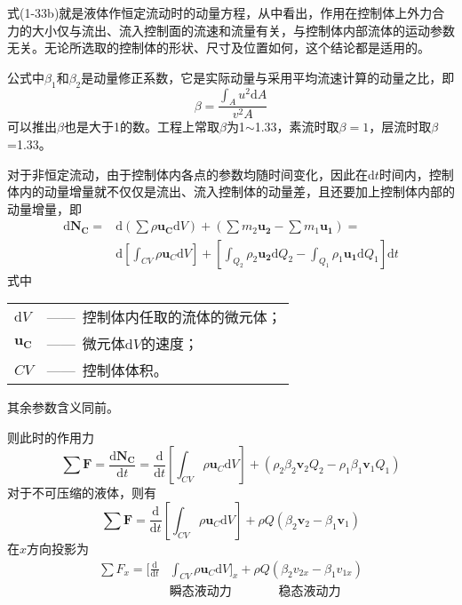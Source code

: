     式(1-33b)就是液体作恒定流动时的动量方程，从中看出，作用在控制体上外力合力的大小仅与流出、流入控制面的流速和流量有关，与控制体内部流体的运动参数无关。无论所选取的控制体的形状、尺寸及位置如何，这个结论都是适用的。    

    公式中$\beta_1$和$\beta_2$是动量修正系数，它是实际动量与采用平均流速计算的动量之比，即 
    \begin{equation}
     \beta=\frac{\int_A u^2\mathrm{d}A}{v^2A}
      \end{equation} 
 可以推出$\beta$也是大于1的数。工程上常取$\beta$为1$\sim$1.33，素流时取$\beta=1$，层流时取$\beta$=1.33。

 对于非恒定流动，由于控制体内各点的参数均随时间变化，因此在$\mathrm{d}t$时间内，控制体内的动量增量就不仅仅是流出、流入控制体的动量差，且还要加上控制体内部的动量增量，即
 \begin{equation*}
  \begin{aligned}
  \mathrm{d}\boldsymbol{N_C}=&\mathrm{d}(\sum\rho \boldsymbol{u_C} \mathrm{d}V)+(\sum{m_2\boldsymbol{u_2}}-\sum{m_1\boldsymbol{u_1}})=\\
  &\mathrm{d}[\int_{CV}\rho {\boldsymbol u}_C \mathrm{d}V]+[\int_{Q_2}\rho_2\boldsymbol{u_2}\mathrm{d}Q_2-\int_{Q_1}\rho_1\boldsymbol{u_1}\mathrm{d}Q_1]\mathrm{d}t
\end{aligned}  
\end{equation*} 
\noindent 式中\
\begin{tabular}[t]{ll}
$\mathrm{d}V$&——\ 控制体内任取的流体的微元体；\\
$\boldsymbol{u_C}$&——\ 微元体$\mathrm{d}V$的速度；\\
$CV$&——\ 控制体体积。
\end{tabular}

其余参数含义同前。

则此时的作用力
\begin{equation*}
  \sum\boldsymbol F=\frac{\mathrm{d}\boldsymbol{N_C}}{\mathrm{d}t}=\frac{\mathrm{d}}{\mathrm{d}t}[\int_{CV}\rho {\boldsymbol u}_C \mathrm{d}V]+(\rho_2\beta_2\boldsymbol v_2 Q_2-\rho_1\beta_1\boldsymbol v_1 Q_1)
\end{equation*}
对于不可压缩的液体，则有
\begin{equation}
\sum\boldsymbol F=\frac{\mathrm{d}}{\mathrm{d}t}[\int_{CV}\rho {\boldsymbol u}_C \mathrm{d}V]+\rho Q(\beta_2\boldsymbol v_2-\beta_1\boldsymbol v_1)
\end{equation}
在$x$方向投影为
\begin{equation}
\begin{aligned}
  \sum F_x=[\frac{\mathrm{d}}{\mathrm{d}t}&\int_{CV}\rho {\boldsymbol u}_C \mathrm{d}V]_x+\rho Q(\beta_2 v_{2x}-\beta_1v_{1x})\\
  &\text{瞬态液动力}\ \ \ \ \ \ \ \ \qquad  \text{稳态液动力}
\end{aligned}
\end{equation}

